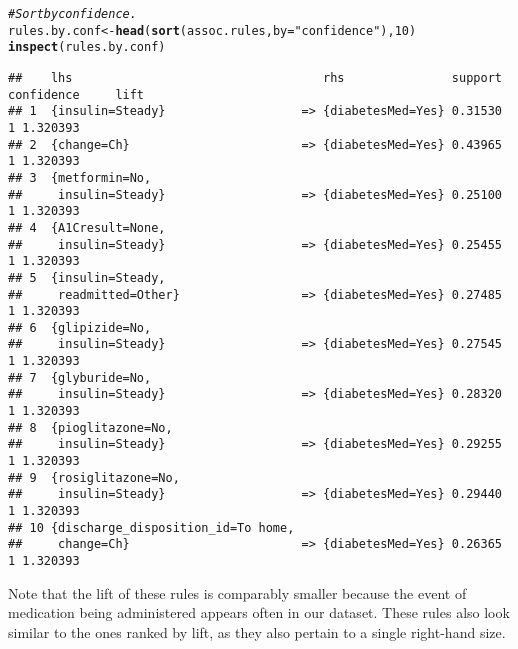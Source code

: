 \documentclass{article}\usepackage[]{graphicx}\usepackage[]{color}
\makeatletter
\newcommand{\hlnum}[1]{\textcolor[rgb]{0.686,0.059,0.569}{#1}}%
\newcommand{\hlstr}[1]{\textcolor[rgb]{0.192,0.494,0.8}{#1}}%
\newcommand{\hlcom}[1]{\textcolor[rgb]{0.678,0.584,0.686}{\textit{#1}}}%
\newcommand{\hlstd}[1]{\textcolor[rgb]{0.345,0.345,0.345}{#1}}%
\newcommand{\hlkwb}[1]{\textcolor[rgb]{0.69,0.353,0.396}{#1}}%
\newcommand{\hlkwc}[1]{\textcolor[rgb]{0.333,0.667,0.333}{#1}}%
\newcommand{\hlkwd}[1]{\textcolor[rgb]{0.737,0.353,0.396}{\textbf{#1}}}%
\newenvironment{kframe}{%
 \def\at@end@of@kframe{}%
 \ifinner\ifhmode%
  \def\at@end@of@kframe{\end{minipage}}%
  \begin{minipage}{\columnwidth}%
 \fi\fi%
 \def\FrameCommand##1{\hskip\@totalleftmargin \hskip-\fboxsep
 \colorbox{shadecolor}{##1}\hskip-\fboxsep
     \hskip-\linewidth \hskip-\@totalleftmargin \hskip\columnwidth}%
 \MakeFramed {\advance\hsize-\width
   \@totalleftmargin\z@ \linewidth\hsize
   \@setminipage}}%
 {\par\unskip\endMakeFramed%
 \at@end@of@kframe}
\newenvironment{knitrout}{}{} %
\makeatother
\begin{document}
\begin{knitrout}
\color{fgcolor}\begin{kframe}
\begin{alltt}
\hlcom{# Sort by confidence.}
\hlstd{rules.by.conf} \hlkwb{<-} \hlkwd{head}\hlstd{(}\hlkwd{sort}\hlstd{(assoc.rules,} \hlkwc{by}\hlstd{=}\hlstr{"confidence"}\hlstd{),} \hlnum{10}\hlstd{)}
\hlkwd{inspect}\hlstd{(rules.by.conf)}
\end{alltt}
\begin{verbatim}
##    lhs                                   rhs               support confidence     lift
## 1  {insulin=Steady}                   => {diabetesMed=Yes} 0.31530          1 1.320393
## 2  {change=Ch}                        => {diabetesMed=Yes} 0.43965          1 1.320393
## 3  {metformin=No,                                                                     
##     insulin=Steady}                   => {diabetesMed=Yes} 0.25100          1 1.320393
## 4  {A1Cresult=None,                                                                   
##     insulin=Steady}                   => {diabetesMed=Yes} 0.25455          1 1.320393
## 5  {insulin=Steady,                                                                   
##     readmitted=Other}                 => {diabetesMed=Yes} 0.27485          1 1.320393
## 6  {glipizide=No,                                                                     
##     insulin=Steady}                   => {diabetesMed=Yes} 0.27545          1 1.320393
## 7  {glyburide=No,                                                                     
##     insulin=Steady}                   => {diabetesMed=Yes} 0.28320          1 1.320393
## 8  {pioglitazone=No,                                                                  
##     insulin=Steady}                   => {diabetesMed=Yes} 0.29255          1 1.320393
## 9  {rosiglitazone=No,                                                                 
##     insulin=Steady}                   => {diabetesMed=Yes} 0.29440          1 1.320393
## 10 {discharge_disposition_id=To home,                                                 
##     change=Ch}                        => {diabetesMed=Yes} 0.26365          1 1.320393
\end{verbatim}
\end{kframe}
\end{knitrout}

Note that the lift of these rules is comparably smaller because the event of
medication being administered appears often in our dataset.  These rules also
look similar to the ones ranked by lift, as they also pertain to a single
right-hand size.
\end{document}
